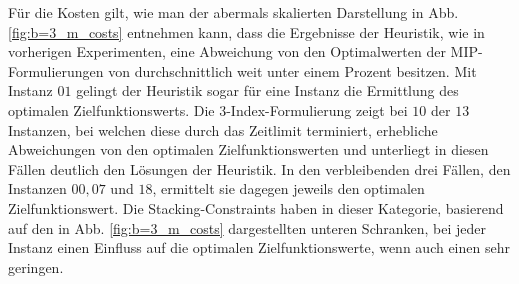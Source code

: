 Für die Kosten gilt, wie man der abermals skalierten Darstellung in Abb. \ref{fig:b=3_m_costs} entnehmen kann, dass die Ergebnisse der Heuristik, wie in vorherigen Experimenten, eine Abweichung von den Optimalwerten der MIP-Formulierungen von durchschnittlich weit unter einem Prozent besitzen. Mit Instanz $01$ gelingt der Heuristik sogar für eine Instanz die
Ermittlung des optimalen Zielfunktionswerts.
Die 3-Index-Formulierung zeigt bei $10$ der $13$ Instanzen, bei welchen diese durch das Zeitlimit
terminiert, erhebliche Abweichungen von den optimalen Zielfunktionswerten und unterliegt in diesen Fällen
deutlich den Lösungen der Heuristik. In den verbleibenden drei Fällen, den Instanzen $00, 07$ und $18$, ermittelt
sie dagegen jeweils den optimalen Zielfunktionswert. Die Stacking-Constraints haben in dieser Kategorie,
basierend auf den in Abb. \ref{fig:b=3_m_costs} dargestellten unteren Schranken, bei jeder Instanz einen Einfluss auf die optimalen Zielfunktionswerte, wenn auch einen sehr geringen.

